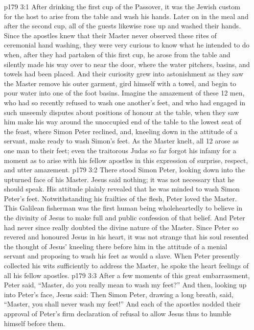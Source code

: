 \vs p179 3:1 After drinking the first cup of the Passover, it was the Jewish custom for the host to arise from the table and wash his hands. Later on in the meal and after the second cup, all of the guests likewise rose up and washed their hands. Since the apostles knew that their Master never observed these rites of ceremonial hand washing, they were very curious to know what he intended to do when, after they had partaken of this first cup, he arose from the table and silently made his way over to near the door, where the water pitchers, basins, and towels had been placed. And their curiosity grew into astonishment as they saw the Master remove his outer garment, gird himself with a towel, and begin to pour water into one of the foot basins. Imagine the amazement of these 12 men, who had so recently refused to wash one another’s feet, and who had engaged in such unseemly disputes about positions of honour at the table, when they saw him make his way around the unoccupied end of the table to the lowest seat of the feast, where Simon Peter reclined, and, kneeling down in the attitude of a servant, make ready to wash Simon’s feet. As the Master knelt, all 12 arose as one man to their feet; even the traitorous Judas so far forgot his infamy for a moment as to arise with his fellow apostles in this expression of surprise, respect, and utter amazement.
\vs p179 3:2 There stood Simon Peter, looking down into the upturned face of his Master. Jesus said nothing; it was not necessary that he should speak. His attitude plainly revealed that he was minded to wash Simon Peter’s feet. Notwithstanding his frailties of the flesh, Peter loved the Master. This Galilean fisherman was the first human being wholeheartedly to believe in the divinity of Jesus  to make full and public confession of that belief. And Peter had never since really doubted the divine nature of the Master. Since Peter so revered and honoured Jesus in his heart, it was not strange that his soul resented the thought of Jesus’ kneeling there before him in the attitude of a menial servant and proposing to wash his feet as would a slave. When Peter presently collected his wits sufficiently to address the Master, he spoke the heart feelings of all his fellow apostles.
\vs p179 3:3 After a few moments of this great embarrassment, Peter said, “Master, do you really mean to wash my feet?” And then, looking up into Peter’s face, Jesus said:  Then Simon Peter, drawing a long breath, said, “Master, you shall never wash my feet!” And each of the apostles nodded their approval of Peter’s firm declaration of refusal to allow Jesus thus to humble himself before them.
